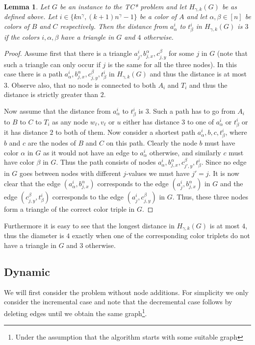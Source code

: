 \documentclass[a4paper,11pt]{article}
\newtheorem{lemma}{Lemma}
\theoremstyle{definition}
\begin{document}
\begin{lemma}\label{lem:diam_graph}
    Let $G$ be an instance to the TC* problem and let $H_{\gamma,k}(G)$ be as
    defined above. Let $i\in \{kn^\gamma, (k+1)n^\gamma-1\}$ be a color of $A$
    and let $\alpha,\beta\in [n]$ be colors of $B$ and $C$ respectively. Then
    the distance from $a^i_\alpha$ to $t^i_\beta$ in $H_{\gamma,k}(G)$ is $3$
    if the colors $i,\alpha,\beta$ have a triangle in $G$ and $4$ otherwise.
\end{lemma}
\begin{proof}
    Assume first that there is a triangle $a^i_j, b^\alpha_{j,x},
    c^\beta_{j,y}$ for some $j$ in $G$ (note that such a triangle can only
    occur if $j$ is the same for all the three nodes). In this case there is a
    path $a^i_\alpha, b^\alpha_{j,x}, c^\beta_{j,y}, t^i_\beta$ in
    $H_{\gamma,k}(G)$ and thus the distance is at most $3$. Observe also, that
    no node is connected to both $A_i$ and $T_i$ and thus the distance is
    strictly greater than $2$.

    Now assume that the distance from $a^i_\alpha$ to $t^i_\beta$ is $3$. Such
    a path has to go from $A_i$ to $B$ to $C$ to $T_i$ as any node $w_\ell,
    v_\ell$ or $u$ either has distance $3$ to one of $a^i_\alpha$ or
    $t^i_\beta$ or it has distance $2$ to both of them. Now consider a shortest
    path $a^i_\alpha, b, c, t^i_\beta$, where $b$ and $c$ are the nodes of $B$
    and $C$ on this path. Clearly the node $b$ must have color $\alpha$ in $G$
    as it would not have an edge to $a^i_\alpha$ otherwise, and similarly $c$
    must have color $\beta$ in $G$. Thus the path consists of nodes
    $a^i_\alpha, b^\alpha_{j,x}, c^\beta_{j',y}, t^i_\beta$. Since no edge in
    $G$ goes between nodes with different $j$-values we must have $j' = j$. It
    is now clear that the edge $(a^i_\alpha, b^\alpha_{j,x})$ corresponds to
    the edge $(a^i_j,b^\alpha_{j,x})$ in $G$ and the edge
    $(c^\beta_{j,y},t^i_\beta)$ corresponds to the edge $(a^i_j,c^\beta_{j,y})$
    in $G$. Thus, these three nodes form a triangle of the correct color triple
    in $G$.
\end{proof}
Furthermore it is easy to see that the longest distance in $H_{\gamma,k}(G)$ is
at most $4$, thus the diameter is $4$ exactly when one of the corresponding
color triplets do not have a triangle in $G$ and $3$ otherwise.

\subsection{Dynamic}
We will first consider the problem without node additions. For simplicity we
only consider the incremental case and note that the decremental case follows
by deleting edges until we obtain the same graph\footnote{Under the assumption
that the algorithm starts with some suitable graph}.
\end{document}
